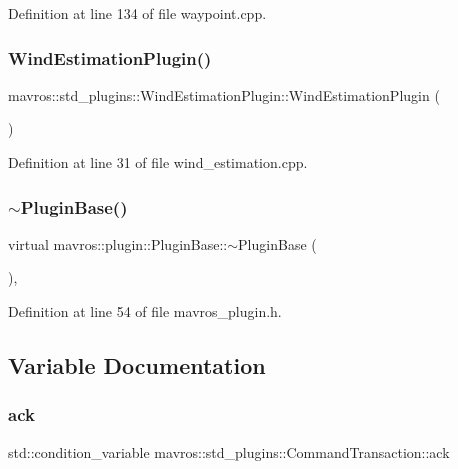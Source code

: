 Definition at line 134 of file waypoint.\+cpp.

\mbox{\label{group__plugin_gaf656179c4da289caeea0c7ee36c25de2}} 
\subsubsection{\texorpdfstring{WindEstimationPlugin()}{WindEstimationPlugin()}}
{\footnotesize\ttfamily mavros\+::std\+\_\+plugins\+::\+Wind\+Estimation\+Plugin\+::\+Wind\+Estimation\+Plugin (\begin{DoxyParamCaption}{ }\end{DoxyParamCaption})\hspace{0.3cm}{\ttfamily [inline]}}



Definition at line 31 of file wind\+\_\+estimation.\+cpp.

\mbox{\label{group__plugin_gad79dda3665b106d020b938fab5a6a5a5}} 
\subsubsection{\texorpdfstring{$\sim$PluginBase()}{~PluginBase()}}
{\footnotesize\ttfamily virtual mavros\+::plugin\+::\+Plugin\+Base\+::$\sim$\+Plugin\+Base (\begin{DoxyParamCaption}{ }\end{DoxyParamCaption})\hspace{0.3cm}{\ttfamily [inline]}, {\ttfamily [virtual]}}



Definition at line 54 of file mavros\+\_\+plugin.\+h.



\subsection{Variable Documentation}
\mbox{\label{group__plugin_gadb97fd9fc709112a544a52a24ecde527}} 
\subsubsection{\texorpdfstring{ack}{ack}\hspace{0.1cm}{\footnotesize\ttfamily [1/2]}}
{\footnotesize\ttfamily std\+::condition\+\_\+variable mavros\+::std\+\_\+plugins\+::\+Command\+Transaction\+::ack}



